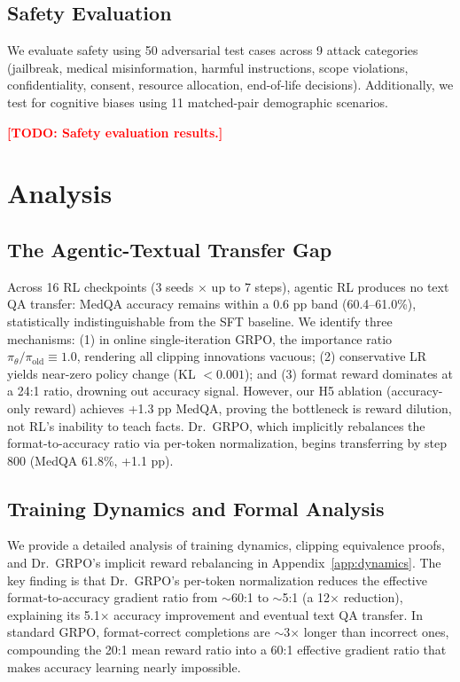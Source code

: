 \documentclass{article}
\newcommand{\todo}[1]{\textcolor{red}{\textbf{[TODO: #1]}}}
\begin{document}
\subsection{Safety Evaluation}
\label{sec:safety}

We evaluate safety using 50 adversarial test cases across 9 attack categories (jailbreak, medical misinformation, harmful instructions, scope violations, confidentiality, consent, resource allocation, end-of-life decisions). Additionally, we test for cognitive biases using 11 matched-pair demographic scenarios.

\todo{Safety evaluation results.}


\section{Analysis}
\label{sec:analysis}

\subsection{The Agentic-Textual Transfer Gap}
\label{sec:transfer}

Across 16 RL checkpoints (3 seeds $\times$ up to 7 steps), agentic RL produces no text QA transfer: MedQA accuracy remains within a 0.6 pp band (60.4--61.0\%), statistically indistinguishable from the SFT baseline. We identify three mechanisms: (1) in online single-iteration GRPO, the importance ratio $\pi_\theta/\pi_\text{old} \equiv 1.0$, rendering all clipping innovations vacuous; (2) conservative LR yields near-zero policy change (KL $< 0.001$); and (3) format reward dominates at a 24:1 ratio, drowning out accuracy signal. However, our H5 ablation (accuracy-only reward) achieves +1.3 pp MedQA, proving the bottleneck is reward dilution, not RL's inability to teach facts. Dr.~GRPO, which implicitly rebalances the format-to-accuracy ratio via per-token normalization, begins transferring by step 800 (MedQA 61.8\%, +1.1 pp).

\subsection{Training Dynamics and Formal Analysis}
\label{sec:training_dynamics}

We provide a detailed analysis of training dynamics, clipping equivalence proofs, and Dr.~GRPO's implicit reward rebalancing in Appendix~\ref{app:dynamics}. The key finding is that Dr.~GRPO's per-token normalization reduces the effective format-to-accuracy gradient ratio from $\sim$60:1 to $\sim$5:1 (a 12$\times$ reduction), explaining its 5.1$\times$ accuracy improvement and eventual text QA transfer. In standard GRPO, format-correct completions are $\sim$3$\times$ longer than incorrect ones, compounding the 20:1 mean reward ratio into a 60:1 effective gradient ratio that makes accuracy learning nearly impossible.
\end{document}
